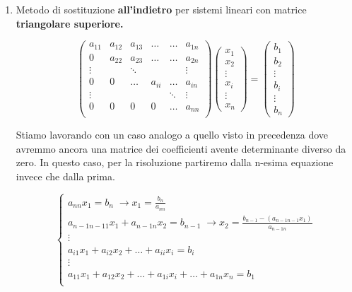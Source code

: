 \documentclass[12pt, a4paper]{book}
\theoremstyle{definition}
\begin{document}
\begin{flushleft}
\begin{enumerate}
	\item Metodo di sostituzione \textbf{all'indietro} per sistemi lineari con matrice \textbf{triangolare superiore.}
	
	\[
		\begin{pmatrix}
			a_{11} & a_{12} & a_{13} & \dots & \dots & a_{1n} \\
			0  & a_{22} & a_{23} &  \dots & \dots & a_{2n} \\
			\vdots & & \ddots &  & & \vdots \\
			0 & 0 & \dots & a_{ii} &  \dots & a_{in} \\
			\vdots & & & & \ddots &   \vdots \\
			0 & 0 & 0 & 0 &  \dots & a_{nn} \\
		\end{pmatrix}
		\begin{pmatrix}
			x_{1}  \\
			x_{2}  \\
			\vdots  \\
			x_{i}  \\
			\vdots  \\
			x_{n}
		\end{pmatrix}
		=
		\begin{pmatrix}
			b_{1}  \\
			b_{2}  \\
			\vdots  \\
			b_{i}  \\
			\vdots  \\
			b_{n}
		\end{pmatrix}
	\]	
	
	Stiamo lavorando con un caso analogo a quello visto in precedenza dove avremmo ancora una matrice dei coefficienti avente determinante diverso da zero. In questo caso, per la risoluzione partiremo dalla n-esima equazione invece che dalla prima.
	
	\[ 
		\begin{cases}
				a_{nn}x_{1} = b_{n} \; \longrightarrow x_{1} = \frac{b_{n}}{a_{nn}} \\   
				a_{n-1n-11}x_{1} + a_{n-1n}x_{2} = b_{n-1} \; \longrightarrow x_{2} = \frac{b_{n-1}-(a_{n-1n-1}x_{1})}{a_{n-1n}}  \\
				\vdots \\
				a_{i1}x_{1} + a_{i2}x_{2}  + \dots + a_{ii}x_{i} = b_{i} \\
				\vdots \\
				a_{11}x_{1} + a_{12}x_{2}  + \dots + a_{1i}x_{i} + \dots + a_{1n}x_{n} = b_{1} \\
		\end{cases}	
	\]
	

\end{enumerate}
\end{flushleft}
\end{document}

